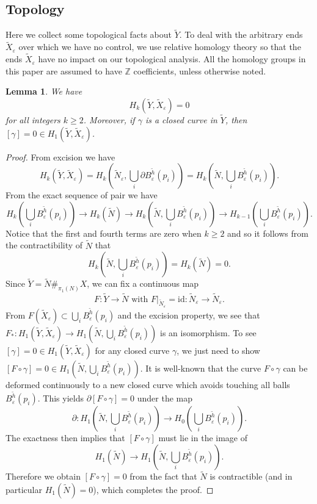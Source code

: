 \documentclass[11pt,letterpaper]{amsart}
\numberwithin{equation}{section}
\newtheorem{lemma}[theorem]{Lemma}
\theoremstyle{definition}
\newcommand{\ve}{\varepsilon}
\newcommand{\ti}[1]{\tilde{#1}}
\begin{document}
\subsection{Topology}
Here we collect some topological facts about  $\tilde{Y}$. To deal with the arbitrary ends $\tilde{X}_\ve$ over which we have no control, we use relative homology theory so that the ends $\tilde{X}_\ve$ have no impact on our topological analysis. All the homology groups in this paper are assumed to have $\mathbb Z$ coefficients, unless otherwise noted.
\begin{lemma}\label{Lem: excision}
We have
$$
H_k(\ti Y, \ti X_{\ve})=0
$$
for all integers $k\geq 2$. Moreover, if $\gamma$ is a closed curve in $\tilde Y$, then $[\gamma]=0\in H_1(\tilde Y,\tilde X_\ve)$.
\end{lemma}
\begin{proof}
From excision we have
$$
H_k(\tilde Y,\tilde X_{\ve})=H_k\left(\tilde N_\ve,\bigcup_i \partial B^{\tilde h}_{\ve}(p_i)\right)=H_k\left(\tilde N,\bigcup_i B_\ve^{\tilde h}(p_i)\right).
$$
From the exact sequence of pair we have
$$
H_{k}\left(\bigcup_i B_\ve^{\tilde h}(p_i)\right)\to H_k(\tilde N)\to H_k\left(\tilde N,\bigcup_i B_\ve^{\tilde h}(p_i)\right)
\to H_{k-1}\left(\bigcup_i B_\ve^{\tilde h}(p_i)\right).
$$
Notice that the first and fourth terms are zero when $k\geq 2$ and so it follows from the contractibility of $\tilde N$ that
$$
H_k\left(\tilde N,\bigcup_iB^{\tilde h}_{\ve}(p_i)\right)=H_k(\tilde N)=0.
$$
Since $\tilde Y=\tilde N\#_{\pi_1(N)}X$, we can fix a continuous map
$$
F:\tilde Y\to \tilde N\mbox{ with }F|_{\tilde N_\ve}=\mathrm {id}:\tilde N_\ve\to \tilde N_\ve.
$$
{From $F(\tilde X_\ve)\subset\bigcup_{i} B_\ve^{\tilde h}(p_i)$ and the excision property,} we see that $F_*:H_1(\tilde Y,\tilde X_\ve)\to H_1(\tilde N,\bigcup_{i} B_\ve^{\tilde h}(p_i))$ is an isomorphism.
To see $[\gamma]=0\in H_1(\tilde Y,\tilde X_\ve)$ for any closed curve $\gamma$, we just need to show $[F\circ \gamma]=0\in H_1(\tilde N,\bigcup_{i} B_\ve^{\tilde h}(p_i))$. It is well-known that the curve $F\circ \gamma$ can be deformed continuously to a new closed curve which avoids touching all balls $B_\ve^{\tilde h}(p_i)$. This yields $\partial[F\circ \gamma]=0$ under the map
$$
\partial:H_1\left(\tilde N,\bigcup_i B_\ve^{\tilde h}(p_i)\right)\to H_{0}\left(\bigcup_i B_\ve^{\tilde h}(p_i)\right).
$$
The exactness then implies that $[F\circ\gamma]$ must lie in the image of
$$
H_1(\tilde N)\to H_1\left(\tilde N,\bigcup_i B_\ve^{\tilde h}(p_i)\right).
$$
Therefore we obtain $[F\circ\gamma]=0$ from the fact that $\tilde N$ is contractible (and in particular $H_1(\tilde N)=0$), which completes the proof.
\end{proof}
\end{document}

